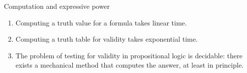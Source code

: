 \documentclass[
  ignorenonframetext,
]{beamer}
\providecommand{\tightlist}{%
  \setlength{\itemsep}{0pt}\setlength{\parskip}{0pt}}
\begin{document}
\begin{frame}{Computation and expressive power}
\protect\hypertarget{computation-and-expressive-power}{}

\begin{enumerate}[<+->]
\tightlist
\item
  Computing a truth value for a formula takes linear time.
\item
  Computing a truth table for validity takes exponential time.
\item
  The problem of testing for validity in propositional logic is
  decidable: there exists a mechanical method that computes the answer,
  at least in principle.
\end{enumerate}

\end{frame}
\end{document}
